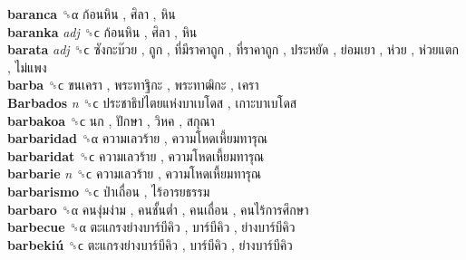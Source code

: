 \textbf{baranca} ␝α   ก้อนหิน ,  ศิลา ,  หิน   \\
\textbf{baranka} \emph{adj}  ␝ϲ   ก้อนหิน ,  ศิลา ,  หิน   \\
\textbf{barata} \emph{adj}  ␝ϲ   ซังกะบ๊วย ,  ถูก ,  ที่มีราคาถูก ,  ที่ราคาถูก ,  ประหยัด ,  ย่อมเยา ,  ห่วย ,  ห่วยแตก ,  ไม่แพง   \\
\textbf{barba} ␝ϲ   ขนเครา ,  พระทาฐิกะ ,  พระทาฒิกะ ,  เครา   \\
\textbf{Barbados} \emph{n}  ␝ϲ   ประชาธิปไตยแห่งบาเบโดส ,  เกาะบาเบโดส   \\
\textbf{barbakoa} ␝ϲ   นก ,  ปักษา ,  วิหค ,  สกุณา   \\
\textbf{barbaridad} ␝α   ความเลวร้าย ,  ความโหดเหี้ยมทารุณ   \\
\textbf{barbaridat} ␝ϲ   ความเลวร้าย ,  ความโหดเหี้ยมทารุณ   \\
\textbf{barbarie} \emph{n}  ␝ϲ   ความเลวร้าย ,  ความโหดเหี้ยมทารุณ   \\
\textbf{barbarismo} ␝ϲ   ป่าเถื่อน ,  ไร้อารยธรรม   \\
\textbf{barbaro} ␝α   คนงุ่มง่าม ,  คนชั้นต่ำ ,  คนเถื่อน ,  คนไร้การศึกษา   \\
\textbf{barbecue} ␝α   ตะแกรงย่างบาร์บีคิว ,  บาร์บีคิว ,  ย่างบาร์บีคิว   \\
\textbf{barbekiú} ␝ϲ   ตะแกรงย่างบาร์บีคิว ,  บาร์บีคิว ,  ย่างบาร์บีคิว   \\
